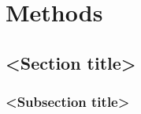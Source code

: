 \chapter{Methods}
\lipsum[5]
\section{<Section title>}
\lipsum[6-10]
\subsection{<Subsection title>}
\lipsum[11-13]\cite{Tholander2014,Zukauskaite2012a} %